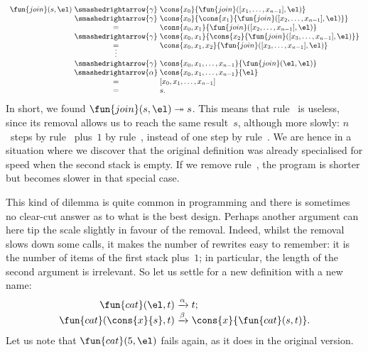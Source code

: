 \begin{equation*}
\begin{array}{r@{\;}c@{\;}l}
\fun{join}(s,\el)
& \smashedrightarrow{\gamma} &
  \cons{x\sb{0}}{\fun{join}([x\sb{1},\ldots,x\sb{n-1}],\el)}\\
& \smashedrightarrow{\gamma} &
  \cons{x\sb{0}}{\cons{x\sb{1}}{\fun{join}([x\sb{2},\ldots,x\sb{n-1}],\el)}}\\
  & = &
  \cons{x\sb{0},x\sb{1}}{\fun{join}([x\sb{2},\ldots,x\sb{n-1}],\el)}\\
& \smashedrightarrow{\gamma} &
  \cons{x\sb{0},x\sb{1}}{\cons{x\sb{2}}{\fun{join}([x\sb{3},\ldots,x\sb{n-1}],\el)}}\\
  & = &
  \cons{x\sb{0},x\sb{1},x\sb{2}}{\fun{join}([x\sb{3},\ldots,x\sb{n-1}],\el)}\\
& \smash{\vdots} &\\
& \smashedrightarrow{\gamma} &
  \cons{x\sb{0},x\sb{1},\ldots,x\sb{n-1}}{\fun{join}(\el,\el)}\\
& \smashedrightarrow{\alpha} & \cons{x\sb{0},x\sb{1},\ldots,x\sb{n-1}}{\el}\\
  & = &
  [x\sb{0},x\sb{1},\ldots,x\sb{n-1}]\\
& = & s.
\end{array}
\end{equation*}
In short, we found \(\fun{join}(s,\el) \twoheadrightarrow s\).
This means that rule~\clause{\beta} is useless, since its removal
allows us to reach the same result~\(s\), although more slowly:
\(n\)~steps by rule~\clause{\gamma} plus~\(1\) by
rule~\clause{\alpha}, instead of one step by
rule~\clause{\beta}. We are hence in a situation where we discover
that the original definition was already specialised for speed when
the second stack is empty. If we remove rule~\clause{\beta}, the
program is shorter but becomes slower in that special case.

This kind of dilemma is quite common in programming and there is
sometimes no clear\hyp{}cut answer as to what is the best
design. Perhaps another argument can here tip the scale slightly in
favour of the removal. Indeed, whilst the removal slows down some
calls, it makes the number of rewrites easy to remember: it is the
number of items of the first stack plus~\(1\); in particular, the
length of the second argument is irrelevant. So let us settle for a
new definition with a new name:
\begin{equation*}
\begin{array}{r@{\;}l@{\;}l}
\fun{cat}(\el,t) & \xrightarrow{\alpha} & t;\\
\fun{cat}(\cons{x}{s},t) & \xrightarrow{\beta} &
\cons{x}{\fun{cat}(s,t)}.
\end{array}
\end{equation*}
Let us note that \(\fun{cat}(5,\el)\) fails again, as it does in the
original version.

